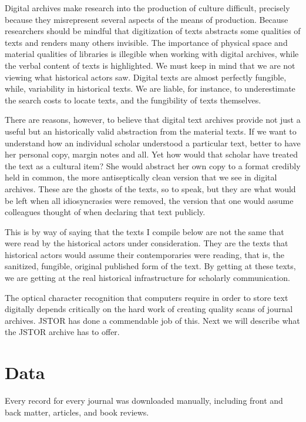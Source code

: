 \documentclass[]{book}
\theoremstyle{definition}
\theoremstyle{definition}
\theoremstyle{definition}
\theoremstyle{remark}
\begin{document}
Digital archives make research into the production of culture difficult,
precisely because they misrepresent several aspects of the means of
production. Because researchers should be mindful that digitization of
texts abstracts some qualities of texts and renders many others
invisible. The importance of physical space and material qualities of
libraries is illegible when working with digital archives, while the
verbal content of texts is highlighted. We must keep in mind that we are
not viewing what historical actors saw. Digital texts are almost
perfectly fungible, while, variability in historical texts. We are
liable, for instance, to underestimate the search costs to locate texts,
and the fungibility of texts themselves.

There are reasons, however, to believe that digital text archives
provide not just a useful but an historically valid abstraction from the
material texts. If we want to understand how an individual scholar
understood a particular text, better to have her personal copy, margin
notes and all. Yet how would that scholar have treated the text as a
cultural item? She would abstract her own copy to a format credibly held
in common, the more antiseptically clean version that we see in digital
archives. These are the ghosts of the texts, so to speak, but they are
what would be left when all idiosyncrasies were removed, the version
that one would assume colleagues thought of when declaring that text
publicly.

This is by way of saying that the texts I compile below are not the same
that were read by the historical actors under consideration. They are
the texts that historical actors would assume their contemporaries were
reading, that is, the sanitized, fungible, original published form of
the text. By getting at these texts, we are getting at the real
historical infrastructure for scholarly communication.

The optical character recognition that computers require in order to
store text digitally depends critically on the hard work of creating
quality scans of journal archives. JSTOR has done a commendable job of
this. Next we will describe what the JSTOR archive has to offer.

\hypertarget{kd-dd}{%
\section{Data}\label{kd-dd}}

Every record for every journal was downloaded manually, including front
and back matter, articles, and book reviews.
\end{document}
